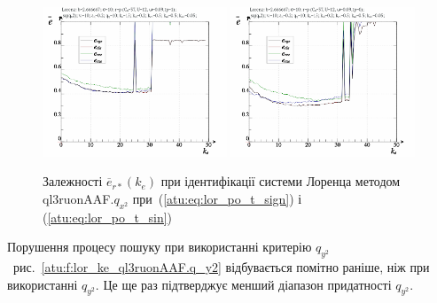 \begin{figure}[ht!]
  \centerline{
    \includegraphics[width=0.49\textwidth]{p/cha/lor/ql3ruonAAF/lor_ql3ruonAAF_qx2-p_k_e_e_sign.png}
    \hfill
    \includegraphics[width=0.49\textwidth]{p/cha/lor/ql3ruonAAF/lor_ql3ruonAAF_qx2-p_k_e_e_sin.png}
  }
\caption{Залежності $ \overline{e}_{r *} (k_e) $ при ідентифікації системи Лоренца методом ql3ruonAAF.$q_{x^2} $ при~(\ref{atu:eq:lor_po_t_sign}) і (\ref{atu:eq:lor_po_t_sin})}
\label{atu:f:lor_ke_ql3ruonAAF.q_x2}
\end{figure}

Порушення процесу пошуку при використанні критерію
$ q_{y^2} $~рис.~\ref{atu:f:lor_ke_ql3ruonAAF.q_y2} відбувається помітно раніше,
ніж при використанні
$ q_{y^2} $. Це ще раз підтверджує менший діапазон придатності
$ q_{y^2} $.

